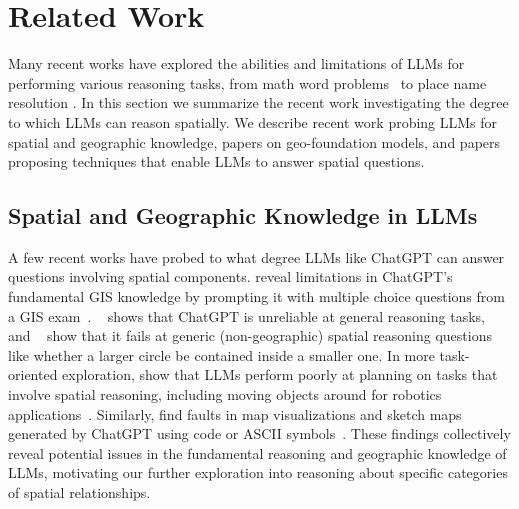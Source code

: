 \section{Related Work}
\label{section:related}
\normalsize

Many recent works have explored the abilities and limitations of LLMs for performing various reasoning tasks, from math word problems~\cite{Gao2023, Badaro2023} to place name resolution \cite{Mai2024}.
In this section we summarize the recent work investigating the degree to which LLMs can reason spatially.
We describe recent work probing LLMs for spatial and geographic knowledge, papers on geo-foundation models, and papers proposing techniques that enable LLMs to answer spatial questions.

\subsection{Spatial and Geographic Knowledge in LLMs}
A few recent works have probed to what degree LLMs like ChatGPT can answer questions involving spatial components.
\citeauthor{Mooney2023} reveal limitations in ChatGPT's fundamental GIS knowledge by prompting it with multiple choice questions from a GIS exam~\cite{Mooney2023}.
\citeauthor{Bang2023}~\cite{Bang2023} shows that ChatGPT is unreliable at general reasoning tasks, and
\citeauthor{Cohn2023}~\cite{Cohn2023} show that it fails at generic (non-geographic) spatial reasoning questions like whether a larger circle be contained inside a smaller one.
In more task-oriented exploration, 
\citeauthor{Xie2023translating} show that LLMs perform poorly at planning on tasks that involve spatial reasoning, including moving objects around for robotics applications~\cite{Xie2023translating}.
Similarly, 
\citeauthor{Tao2023} find faults in map visualizations and sketch maps generated by ChatGPT using code or ASCII symbols~\cite{Tao2023}.
These findings collectively reveal potential issues in the fundamental reasoning and geographic knowledge of LLMs, motivating our further exploration into reasoning about specific categories of spatial relationships.

